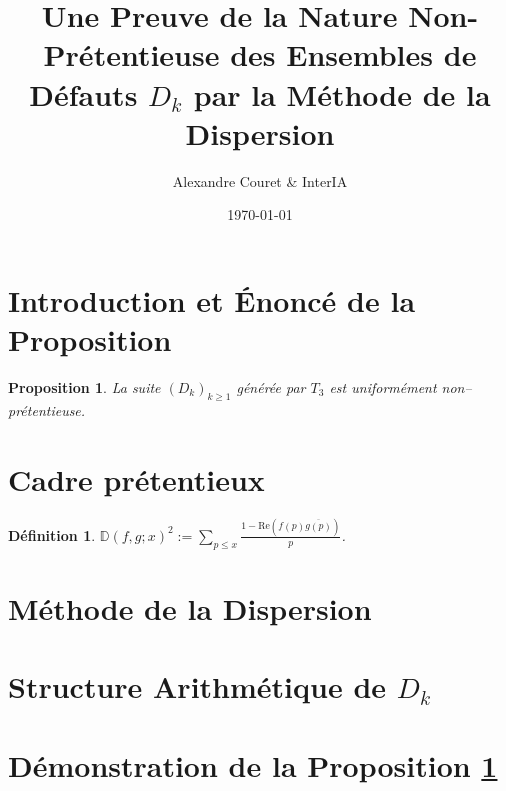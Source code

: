 \documentclass[11pt]{article}
\title{Une Preuve de la Nature Non-Pr\'etentieuse des Ensembles de D\'efauts $D_k$ par la M\'ethode de la Dispersion}
\author{Alexandre Couret \& InterIA}
\date{\today}
\numberwithin{equation}{section}
\newtheorem{proposition}[theorem]{Proposition}
\newtheorem{definition}[theorem]{D\'efinition}
\begin{document}
\maketitle
\section{Introduction et \'Enonc\'e de la Proposition}
\begin{proposition}\label{prop:dispersion_appendix}
La suite $(D_k)_{k\ge 1}$ g\'en\'er\'ee par $T_3$ est uniform\'ement non--pr\'etentieuse.
\end{proposition}
\section{Cadre pr\'etentieux}\begin{definition}
$\mathbb{D}(f,g;x)^2 := \sum_{p\le x}\frac{1-\mathrm{Re}(f(p)\overline{g(p)})}{p}$.
\end{definition}
\section{M\'ethode de la Dispersion}
\section{Structure Arithm\'etique de $D_k$}
\section{D\'emonstration de la Proposition \ref{prop:dispersion_appendix}}
\end{document}
